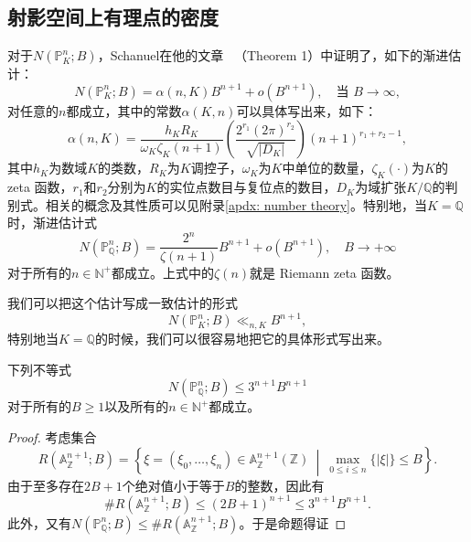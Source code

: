 \subsection{射影空间上有理点的密度}
对于$N(\mathbb{P}^n_K;B)$，Schanuel在他的文章~ （Theorem 1）中证明了，如下的渐进估计：
\begin{equation} \label{Schanuel estimate}
N(\mathbb{P}^n_K;B) = \alpha(n,K)B^{n+1} + o(B^{n+1}), \quad \text{当 } B \to \infty,
\end{equation}
对任意的$n$都成立，其中的常数$\alpha(K,n)$可以具体写出来，如下：
\begin{equation} \label{schanuel's constant}
\alpha(n,K) = \dfrac{h_KR_K}{\omega_K\zeta_K(n+1)} \left(\dfrac{2^{r_1}(2\pi)^{r_2}}{\sqrt{|D_K|}}\right)(n+1)^{r_1+r_2-1},
\end{equation}
其中$h_K$为数域$K$的类数，$R_K$为$K$调控子，$\omega_K$为$K$中单位的数量，$\zeta_K(\cdot)$为$K$的 zeta 函数，$r_1$和$r_2$分别为$K$的实位点数目与复位点的数目，$D_K$为域扩张$K/\mathbb{Q}$的判别式。相关的概念及其性质可以见附录\ref{apdx: number theory}。特别地，当$K = \mathbb{Q}$时，渐进估计式
\begin{equation} \label{Schanuel over Q}
N(\mathbb{P}^n_{\mathbb{Q}};B) = \frac{2^n}{\zeta(n+1)}B^{n+1} + o(B^{n+1}), \quad B \rightarrow +\infty
\end{equation}
对于所有的$n\in \mathbb{N}^+$都成立。上式中的$\zeta(n)$就是 Riemann zeta 函数。

我们可以把这个估计写成一致估计的形式
\begin{equation}
N(\mathbb{P}^n_K;B) \ll_{n,K} B^{n+1},
\end{equation}
特别地当$K = \mathbb{Q}$的时候，我们可以很容易地把它的具体形式写出来。

\begin{proposition}
下列不等式
\begin{equation} \label{uniform estimate}
N(\mathbb{P}^n_{\mathbb{Q}};B) \leqslant 3^{n+1}B^{n+1}
\end{equation}
对于所有的$B \geqslant 1$以及所有的$n \in \mathbb{N}^+$都成立。
\end{proposition}

\begin{proof}
考虑集合
\begin{equation}
R(\mathbb{A}_{\mathbb{Z}}^{n+1};B) = \left\{ \xi =(\xi_0,\ldots,\xi_n) \in \mathbb{A}_{\mathbb{Z}}^{n+1} (\mathbb{Z}) \ \middle|\ \max_{0 \leqslant i \leqslant n} \{|\xi|\} \leqslant B \right\}.
\end{equation}
由于至多存在$2B+1$个绝对值小于等于$B$的整数，因此有
\begin{equation}
\#R(\mathbb{A}_{\mathbb{Z}}^{n+1};B) \leqslant (2B+1)^{n+1} \leqslant 3^{n+1}B^{n+1}.
\end{equation}
此外，又有$N(\mathbb{P}^n_{\mathbb{Q}};B) \leqslant \#R(\mathbb{A}_{\mathbb{Z}}^{n+1};B)$。于是命题得证
\end{proof}

